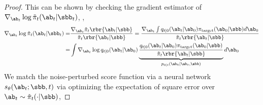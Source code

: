 \begin{proof}
    This can be shown by checking the gradient estimator of $\nabla_{\ab_t}\log\tilde\pi_t(\ab_t|\sbb_t)$, \ie,
    \begin{align}
    \nabla_{\ab_t}\log\tilde\pi_t(\ab_t|\sbb_t) %
            = & \frac{\nabla_{\ab_t}\tilde\pi_t\rbr{\ab_t|\sbb}}{\tilde\pi_t\rbr{\ab_t|\sbb}}           =  \frac{\nabla_{\ab_t}\int q_{t|0}(\ab_t|\ab_0)\pi_{\rm target}(\ab_0|\sbb)d\ab_0}{\tilde\pi_t\rbr{\ab_t|\sbb}}\notag\\
            = & \int \nabla_{\ab_t}\log q_{t|0}(\ab_t|\ab_0)\underbrace{\frac{q_{t|0}(\ab_t|\ab_0)\pi_{\rm target}(\ab_0|\sbb)}{\tilde\pi_t\rbr{\ab_t|\sbb}}}_{p_{0|t}(\ab_0|\ab_t, \sbb)}d\ab_0 \nonumber
    \end{align}
    We match the noise-perturbed score function via a neural network $s_\theta(\ab_t;\sbb, t)$ via optimizing the expectation of square error over $\ab_t\sim \tilde\pi_t(\cdot|\sbb)$,
    

\end{proof}
